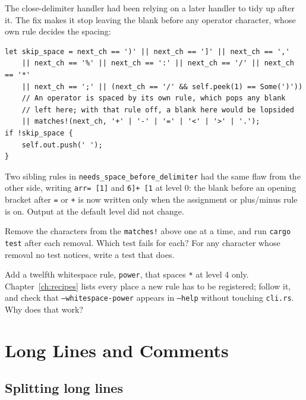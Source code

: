 \documentclass[11pt,a4paper,openany]{book}
\newcommand{\code}[1]{\texttt{\small #1}}
\newcommand{\file}[1]{\texttt{\small\color{accent}#1}}
\newcounter{exercise}[chapter]
\begin{document}
The close-delimiter handler had been relying on a later handler to tidy up after
it. The fix makes it stop leaving the blank before any operator character, whose
own rule decides the spacing:

\begin{lstlisting}[style=rust]
let skip_space = next_ch == ')' || next_ch == ']' || next_ch == ','
    || next_ch == '%' || next_ch == ':' || next_ch == '/' || next_ch == '*'
    || next_ch == ';' || (next_ch == '/' && self.peek(1) == Some(')'))
    // An operator is spaced by its own rule, which pops any blank
    // left here; with that rule off, a blank here would be lopsided
    || matches!(next_ch, '+' | '-' | '=' | '<' | '>' | '.');
if !skip_space {
    self.out.push(' ');
}
\end{lstlisting}

Two sibling rules in \code{needs\_space\_before\_delimiter} had the same flaw
from the other side, writing \code{arr= [1]} and \code{6]+ [1} at level 0:
the blank before an opening bracket after \code{=} or \code{+} is now written
only when the assignment or plus/minus rule is on. Output at the default level
did not change.

\begin{exercise}
Remove the characters from the \code{matches!} above one at a time, and run
\code{cargo test} after each removal. Which test fails for each? For any
character whose removal no test notices, write a test that does.
\end{exercise}

\begin{exercise}
Add a twelfth whitespace rule, \code{power}, that spaces \code{**} at level 4
only. Chapter~\ref{ch:recipes} lists every place a new rule has to be
registered; follow it, and check that \code{--whitespace-power} appears in
\code{--help} without touching \file{cli.rs}. Why does that work?
\end{exercise}

\chapter{Long Lines and Comments}\label{ch:lines}

\section{Splitting long lines}\label{sec:linesplit}
\end{document}
